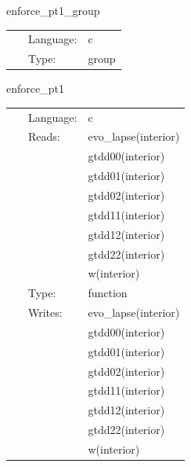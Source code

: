 \documentclass{article}
\begin{document}
\vspace{5mm}


\hspace{5mm} enforce\_pt1\_group 

\hspace{5mm}{\it group for function `enforce\_pt1`. generated by einsteinengine. } 


\hspace{5mm}

 \begin{tabular*}{160mm}{cll} 
~ & Language:  & c \\ 
~ & Type:  & group \\ 
\end{tabular*} 


\vspace{5mm}


\hspace{5mm} enforce\_pt1 

\hspace{5mm}{\it function `enforce\_pt1` generated by einsteinengine. } 


\hspace{5mm}

 \begin{tabular*}{160mm}{cll} 
~ & Language:  & c \\ 
~ & Reads:  & evo\_lapse(interior) \\ 
~& ~ &gtdd00(interior)\\ 
~& ~ &gtdd01(interior)\\ 
~& ~ &gtdd02(interior)\\ 
~& ~ &gtdd11(interior)\\ 
~& ~ &gtdd12(interior)\\ 
~& ~ &gtdd22(interior)\\ 
~& ~ &w(interior)\\ 
~ & Type:  & function \\ 
~ & Writes:  & evo\_lapse(interior) \\ 
~& ~ &gtdd00(interior)\\ 
~& ~ &gtdd01(interior)\\ 
~& ~ &gtdd02(interior)\\ 
~& ~ &gtdd11(interior)\\ 
~& ~ &gtdd12(interior)\\ 
~& ~ &gtdd22(interior)\\ 
~& ~ &w(interior)\\ 
\end{tabular*} 
\end{document}
